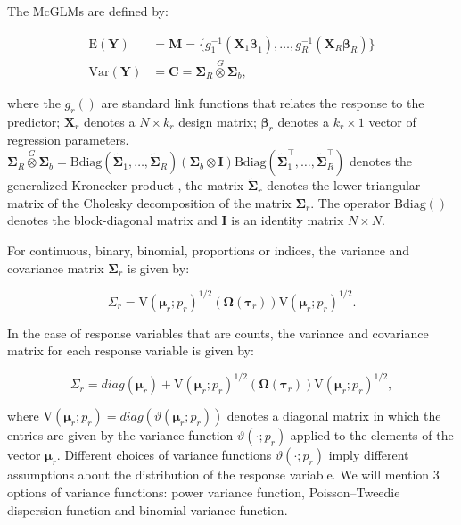 \documentclass[USenglish]{article}
\theoremstyle{dgthm}
\theoremstyle{dgdef}
\begin{document}
The McGLMs \citep{Bonat16} are defined by:

$$
      \begin{aligned}
        \mathrm{E}(\boldsymbol{Y}) &=
          \boldsymbol{M} =
            \{g_1^{-1}(\boldsymbol{X}_1 \boldsymbol{\beta}_1),
            \ldots,
            g_R^{-1}(\boldsymbol{X}_R \boldsymbol{\beta}_R)\}
          \\
        \mathrm{Var}(\boldsymbol{Y}) &=
          \boldsymbol{C} =
            \boldsymbol{\Sigma}_R \overset{G} \otimes
            \boldsymbol{\Sigma}_b,
      \end{aligned}
$$

\noindent where the $g_r()$ are standard link functions that relates the response to the predictor; $\boldsymbol{X}_r$ denotes a $N \times k_r$ design matrix; $\boldsymbol{\beta}_r$ denotes a  $k_r \times 1$ vector of regression parameters. $\boldsymbol{\Sigma}_R \overset{G} \otimes \boldsymbol{\Sigma}_b = \mathrm{Bdiag}(\tilde{\boldsymbol{\Sigma}}_1, \ldots, \tilde{\boldsymbol{ \Sigma}}_R) (\boldsymbol{\Sigma}_b \otimes \boldsymbol{I}) \mathrm{Bdiag}(\tilde{\boldsymbol{\Sigma}}_1^\top, \ldots, \tilde{\boldsymbol{\Sigma}}_R^\top)$ denotes the generalized Kronecker product \cite{martinez13}, the matrix $\tilde{\boldsymbol{\Sigma}}_r$ denotes the lower triangular matrix of the Cholesky decomposition of the matrix ${\boldsymbol{\Sigma}}_r$. The operator $\mathrm{Bdiag()}$ denotes the block-diagonal matrix and $\boldsymbol{I}$ is an identity matrix $N \times N$.

For continuous, binary, binomial, proportions or indices, the variance and covariance matrix $\boldsymbol{\Sigma}_r$ is given by:

$$
\Sigma_r =
\mathrm{V}\left(\boldsymbol{\mu}_r; p_r\right)^{1/2}(\boldsymbol{\Omega}\left(\boldsymbol{\tau}_r\right))\mathrm{V}\left(\boldsymbol{\mu}_r; p_r\right)^{1/2}.
$$

In the case of response variables that are counts, the variance and covariance matrix for each response variable is given by:

$$
\Sigma_r = diag(\boldsymbol{\mu}_r)+ \mathrm{V}\left(\boldsymbol{\mu}_r; p_r\right)^{1/2}(\boldsymbol{\Omega}\left(\boldsymbol{\tau}_r\right))\mathrm{V}\left(\boldsymbol{\mu}_r; p_r\right)^{1/2},
$$

\noindent where $\mathrm{V}\left(\boldsymbol{\mu}_r; p_r\right) = diag(\vartheta(\boldsymbol{\mu}_r; p_r))$ denotes a diagonal matrix in which the entries are given by the variance function $\vartheta(\cdot; p_r)$ applied to the elements of the vector $\boldsymbol{\mu}_r$. Different choices of variance functions $\vartheta(\cdot; p_r)$ imply different assumptions about the distribution of the response variable. We will mention 3 options of variance functions: power variance function, Poisson–Tweedie dispersion function and binomial variance function.
\end{document}
